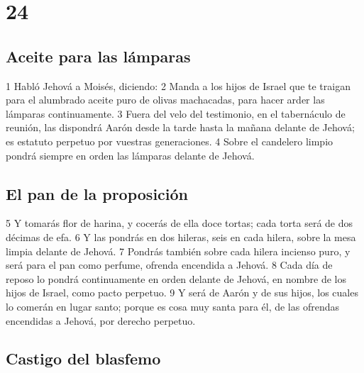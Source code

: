 \chapter{24}

\section*{Aceite para las lámparas}

1 Habló Jehová a Moisés, diciendo:
2 Manda a los hijos de Israel que te traigan para el alumbrado aceite puro de olivas machacadas, para hacer arder las lámparas continuamente.
3 Fuera del velo del testimonio, en el tabernáculo de reunión, las dispondrá Aarón desde la tarde hasta la mañana delante de Jehová; es estatuto perpetuo por vuestras generaciones.
4 Sobre el candelero limpio pondrá siempre en orden las lámparas delante de Jehová.

\section*{El pan de la proposición}

5 Y tomarás flor de harina, y cocerás de ella doce tortas; cada torta será de dos décimas de efa.
6 Y las pondrás en dos hileras, seis en cada hilera, sobre la mesa limpia delante de Jehová.
7 Pondrás también sobre cada hilera incienso puro, y será para el pan como perfume, ofrenda encendida a Jehová.
8 Cada día de reposo lo pondrá continuamente en orden delante de Jehová, en nombre de los hijos de Israel, como pacto perpetuo.
9 Y será de Aarón y de sus hijos, los cuales lo comerán en lugar santo; porque es cosa muy santa para él, de las ofrendas encendidas a Jehová, por derecho perpetuo.

\section*{Castigo del blasfemo}

